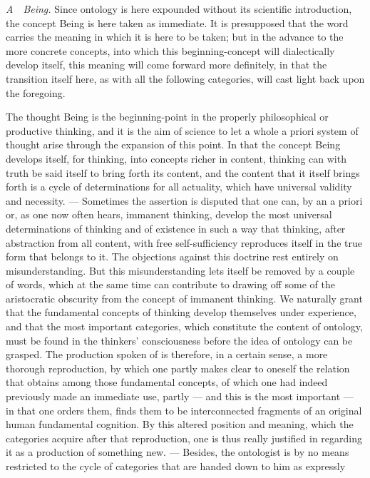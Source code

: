 \documentclass[12pt]{article}
\newcommand{\opage}[1]{\marginnote{\footnotesize\textit{[#1]}}}
\begin{document}
\emph{A}~~\emph{Being.} Since ontology is here expounded without its scientific
introduction, the concept Being is here taken as immediate. It is presupposed that
the word carries the meaning in which it is here to be taken; but in the advance to
the more concrete concepts, into which this beginning-concept will dialectically
develop itself, \opage{208}this meaning will come forward more definitely, in that
the transition itself here, as with all the following categories, will cast light
back upon the foregoing.

The thought Being is the beginning-point in the properly philosophical or productive
thinking, and it is the aim of science to let a whole a priori system of thought
arise through the expansion of this point. In that the concept Being develops itself,
for thinking, into concepts richer in content, thinking can with truth be said itself
to bring forth its content, and the content that it itself brings forth is a cycle of
determinations for all actuality, which have universal validity and necessity. ---
Sometimes the assertion is disputed that one can, by an a priori or, as one now often
hears, immanent thinking, develop the most universal determinations of thinking and
of existence in such a way that thinking, after abstraction from all content, with
free self-sufficiency reproduces itself in the true form that belongs to it. The
objections against this doctrine rest entirely on misunderstanding. But this
misunderstanding lets itself be removed by a couple of words, which at the same time
can contribute to drawing off some of the aristocratic obscurity from the concept of
immanent thinking. We naturally grant that the fundamental concepts of thinking
develop themselves under experience, and that the most important categories, which
constitute the content of ontology, must be found in the thinkers' consciousness
before the idea of ontology can be grasped. The production spoken of is therefore, in
a certain sense, a more thorough reproduction, by which one partly makes clear to
oneself the relation that obtains among those fundamental concepts, of which one had
indeed previously made an immediate use, partly --- and this is the most important
--- in that one orders them, finds them to be interconnected fragments of an original
human fundamental cognition. By this altered position and meaning, which the
categories acquire after that reproduction, one is thus really justified in regarding
it as a \opage{209}production of something new. --- Besides, the ontologist is by no
means restricted to the cycle of categories that are handed down to him as expressly
\end{document}

